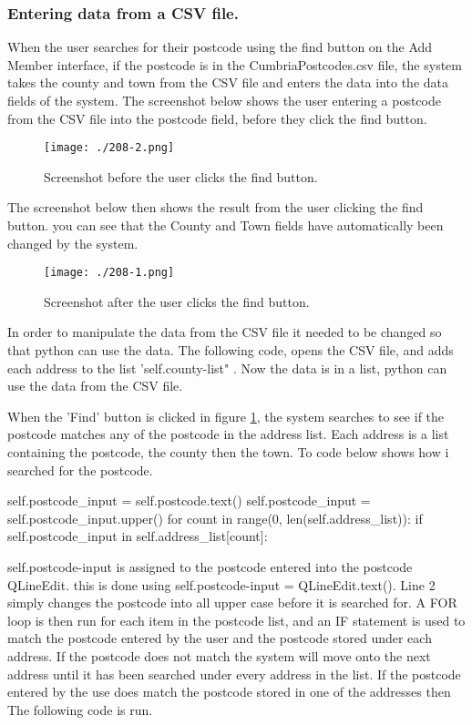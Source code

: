 \pagebreak

\subsubsection{Entering data from a CSV file.}
When the user searches for their postcode using the find button on the Add Member interface, if the postcode is in the CumbriaPostcodes.csv file, the system takes the county and town from the CSV file and enters the data into the data fields of the system. The screenshot below shows the user entering a postcode from the CSV file into the postcode field, before they click the find button.

\begin{figure}[H]
\caption{Screenshot before the user clicks the find button.} \label{fig:find-postcode}
\texttt{[image: ./208-2.png]}
\end{figure}

The screenshot below then shows the result from the user clicking the find button. you can see that the County and Town fields have automatically been changed by the system.

\begin{figure}[H]
\caption{Screenshot after the user clicks the find button.} \label{fig:found-postcode}
\texttt{[image: ./208-1.png]}
\end{figure}

In order to manipulate the data from the CSV file it needed to be changed so that python can use the data. The following code, opens the CSV file, and adds each address to the list 'self.county-list" . Now the data is in a list, python can use the data from the CSV file. 

When the 'Find' button is clicked in figure \ref{fig:find-postcode}, the system searches to see if the postcode matches any of the postcode in the address list. Each address is a list containing the postcode, the county then the town. To code below shows how i searched for the postcode.

\begin{python}
self.postcode_input = self.postcode.text()
self.postcode_input = self.postcode_input.upper()
for count in range(0, len(self.address_list)):
	if self.postcode_input in self.address_list[count]:
\end{python}

self.postcode-input is assigned to the postcode entered into the postcode QLineEdit. this is done using self.postcode-input = QLineEdit.text(). Line 2 simply changes the postcode into all upper case before it is searched for. A FOR loop is then run for each item in the postcode list, and an IF statement is used to match the postcode entered by the user and the postcode stored under each address. If the postcode does not match the system will move onto the next address until it has been searched under every address in the list. If the postcode entered by the use does match the postcode stored in one of the addresses then The following code is run.

